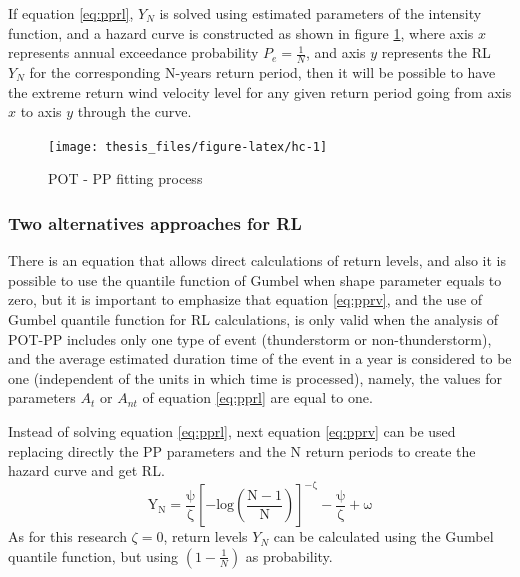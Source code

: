 \documentclass[12pt,oneside]{reedthesis}
\begin{document}
If equation \eqref{eq:pprl}, \(Y_N\) is solved using estimated parameters of the intensity function, and a hazard curve is constructed as shown in figure \ref{fig:hc}, where axis \(x\) represents annual exceedance probability \(P_e = \frac{1}{N}\), and axis \(y\) represents the RL \(Y_N\) for the corresponding N-years return period, then it will be possible to have the extreme return wind velocity level for any given return period going from axis \(x\) to axis \(y\) through the curve.

\footnotesize
\begin{figure}

{\centering \texttt{[image: thesis\_files/figure-latex/hc-1]} 

}

\caption{POT - PP fitting process}\label{fig:hc}
\end{figure}
\normalsize

\hypertarget{two-alternatives-approaches-for-rl}{%
\subsubsection{Two alternatives approaches for RL}\label{two-alternatives-approaches-for-rl}}

There is an equation that allows direct calculations of return levels, and also it is possible to use the quantile function of Gumbel when shape parameter equals to zero, but it is important to emphasize that equation \eqref{eq:pprv}, and the use of Gumbel quantile function for RL calculations, is only valid when the analysis of POT-PP includes only one type of event (thunderstorm or non-thunderstorm), and the average estimated duration time of the event in a year is considered to be one (independent of the units in which time is processed), namely, the values for parameters \(A_t\) or \(A_{nt}\) of equation \eqref{eq:pprl} are equal to one.

Instead of solving equation \eqref{eq:pprl}, next equation \eqref{eq:pprv} can be used replacing directly the PP parameters and the N return periods to create the hazard curve and get RL.
\begin{equation}
  \mathrm{
Y_N=\frac{\psi}{\zeta}\left[-log\left(\frac{N-1}{N}\right)\right]^{-\zeta}-\frac{\psi}{\zeta}+\omega
        }
  \label{eq:pprv}
\end{equation}
As for this research \(\zeta = 0\), return levels \(Y_N\) can be calculated using the Gumbel quantile function, but using \((1-\frac{1}{N})\) as probability.
\end{document}
